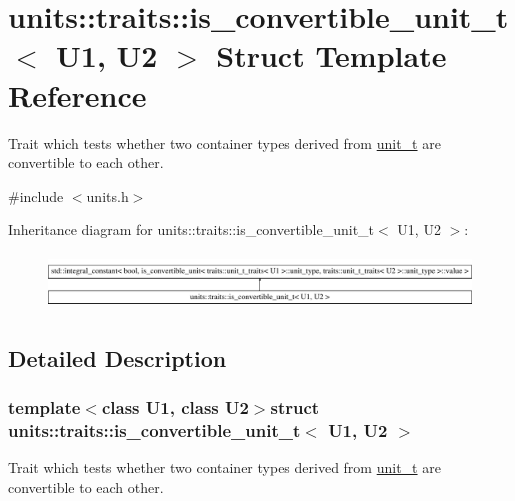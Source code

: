 \hypertarget{structunits_1_1traits_1_1is__convertible__unit__t}{}\section{units\+:\+:traits\+:\+:is\+\_\+convertible\+\_\+unit\+\_\+t$<$ U1, U2 $>$ Struct Template Reference}
\label{structunits_1_1traits_1_1is__convertible__unit__t}


Trait which tests whether two container types derived from {\ttfamily \hyperlink{classunits_1_1unit__t}{unit\+\_\+t}} are convertible to each other.  




{\ttfamily \#include $<$units.\+h$>$}

Inheritance diagram for units\+:\+:traits\+:\+:is\+\_\+convertible\+\_\+unit\+\_\+t$<$ U1, U2 $>$\+:\begin{figure}[H]
\begin{center}
\leavevmode
\includegraphics[height=1.479524cm]{structunits_1_1traits_1_1is__convertible__unit__t}
\end{center}
\end{figure}


\subsection{Detailed Description}
\subsubsection*{template$<$class U1, class U2$>$struct units\+::traits\+::is\+\_\+convertible\+\_\+unit\+\_\+t$<$ U1, U2 $>$}

Trait which tests whether two container types derived from {\ttfamily \hyperlink{classunits_1_1unit__t}{unit\+\_\+t}} are convertible to each other. 

